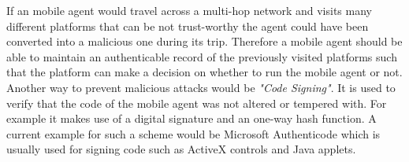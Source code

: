 \documentclass{report}
\begin{document}
\begin{enumerate}[a)]
			If an mobile agent would travel across a multi-hop network and visits many different platforms that can be not trust-worthy the agent could have been converted into a malicious one during its trip. Therefore a mobile agent should be able to maintain an authenticable record of the previously visited platforms such that the platform can make a decision on whether to run the mobile agent or not. \\
			Another way to prevent malicious attacks would be \textit{"Code Signing"}. It is used to verify that the code of the mobile agent was not altered or tempered with. For example it makes use of a digital signature and an one-way hash function. A current example for such a scheme would be Microsoft Authenticode which is usually used for signing code such as ActiveX controls and Java applets.
		\end{enumerate}
	\closesection
	
	
\end{document}
